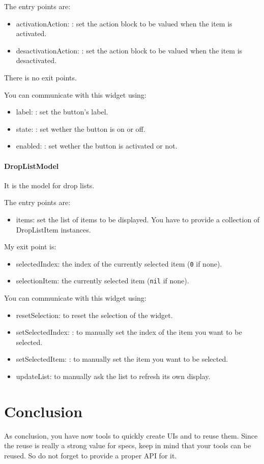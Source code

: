 \documentclass[a4paper,10pt,twoside]{book}
\begin{document}
The entry points are:
\begin{itemize}
	\item activationAction: : set the action block to be valued when the item is activated.
	\item desactivationAction: : set the action block to be valued when the item is desactivated.
\end{itemize}

There is no exit points.	

You can communicate with this widget using:
\begin{itemize}		
	\item label: : set the button's label.
	\item state: : set wether the button is on or off.
	\item enabled: : set wether the button is activated or not.
\end{itemize}

\paragraph{DropListModel} It is the model for drop lists.

The entry points are:
\begin{itemize}
	\item items: set the list of items to be displayed. You have to provide a collection of DropListItem instances.
\end{itemize}
My exit point is:
\begin{itemize}
	\item selectedIndex: the index of the currently selected item (\verb+0+ if none).
	\item selectionItem: the currently selected item (\verb+nil+ if none).
\end{itemize}
You can communicate with this widget using:
\begin{itemize}
\item resetSelection: to reset the selection of the widget.
\item setSelectedIndex: : to manually set the index of the item you want to be selected.
\item setSelectedItem: : to manually set the item you want to be selected. 
\item updateList: to manually ask the list to refresh its own display.
\end{itemize}




\section{Conclusion}
As conclusion, you have now tools to quickly create UIs and to reuse them. Since the reuse is really a strong value for specs, keep in mind that your tools can be reused. So do not forget to provide a proper API for it.

\ifx\wholebook\relax\else
   
   
\end{document}

